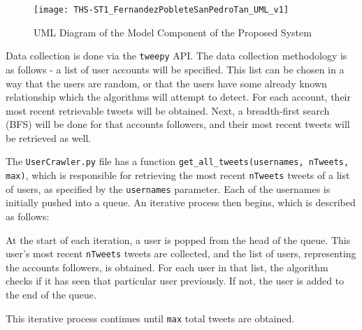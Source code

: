 \newpage




\begin{landscape}
	\begin{figure}
		\centering
		\texttt{[image: THS-ST1\_FernandezPobleteSanPedroTan\_UML\_v1]}
		\caption{UML Diagram of the Model Component of the Proposed System}
		\label{fig:uml}	
	\end{figure}
\end{landscape}




\newpage




Data collection is done via the \texttt{tweepy} API. The data collection methodology is as follows - a list of user accounts will be specified. This list can be chosen in a way that the users are random, or that the users have some already known relationship which the algorithms will attempt to detect. For each account, their most recent retrievable tweets will be obtained. Next, a breadth-first search (BFS) will be done for that account\vtick s followers, and their most recent tweets will be retrieved as well. 








The \texttt{UserCrawler.py} file has a function \texttt{get\_all\_tweets(usernames, nTweets, max)}, which is responsible for retrieving the most recent \texttt{nTweets} tweets of a list of users, as specified by the \texttt{usernames} parameter. Each of the usernames is initially pushed into a queue. An iterative process then begins, which is described as follows:








At the start of each iteration, a user is popped from the head of the queue. This user’s most recent \texttt{nTweets} tweets are collected, and the list of users, representing the account\vtick s followers, is obtained. For each user in that list, the algorithm checks if it has seen that particular user previously. If not, the user is added to the end of the queue.








This iterative process continues until \texttt{max} total tweets are obtained.








